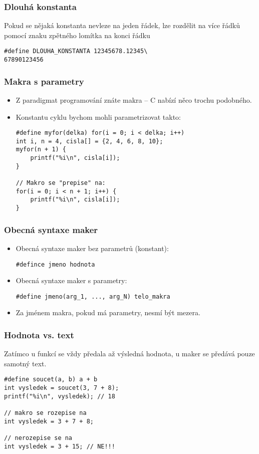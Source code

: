 \documentclass{beamer}
\newenvironment{itemizex}%
  {\large \begin{itemize}%
    \setlength{\itemsep}{8pt}%
    \setlength{\parskip}{8pt}}%
  {\end{itemize}}
\begin{document}
\begin{frame}[t,fragile]\frametitle{Dlouhá konstanta} 
Pokud se nějaká konstanta nevleze na jeden řádek, lze rozdělit na více řádků pomocí znaku zpětného lomítka na konci řádku
\begin{verbatim} 
#define DLOUHA_KONSTANTA 12345678.12345\
67890123456
\end{verbatim}
\end{frame}


\begin{frame}[t,fragile]\frametitle{Makra s parametry} 
    \begin{itemize}
        \item Z paradigmat programování znáte makra -- C nabízí něco trochu podobného. 
        \item Konstantu cyklu bychom mohli parametrizovat takto:
\begin{verbatim} 
#define myfor(delka) for(i = 0; i < delka; i++)
int i, n = 4, cisla[] = {2, 4, 6, 8, 10};
myfor(n + 1) {
    printf("%i\n", cisla[i]);
}

// Makro se "prepise" na:
for(i = 0; i < n + 1; i++) {
    printf("%i\n", cisla[i]);
}
\end{verbatim}
    \end{itemize}
\end{frame}


\begin{frame}[t,fragile]\frametitle{Obecná syntaxe maker} 
\begin{itemizex}
    \item Obecná syntaxe maker bez parametrů (konstant):
\begin{verbatim} 
#defince jmeno hodnota
\end{verbatim}
    \item Obecná syntaxe maker s parametry:
    \begin{verbatim} 
#define jmeno(arg_1, ..., arg_N) telo_makra
    \end{verbatim}
    \item Za jménem makra, pokud má parametry, nesmí být mezera. 
\end{itemizex}
\end{frame}


\begin{frame}[t,fragile]\frametitle{Hodnota vs. text} 
Zatímco u funkcí se vždy předala až výsledná hodnota, u maker se předává pouze samotný text. 
\begin{verbatim} 
#define soucet(a, b) a + b
int vysledek = soucet(3, 7 + 8);
printf("%i\n", vysledek); // 18

// makro se rozepise na
int vysledek = 3 + 7 + 8;

// nerozepise se na 
int vysledek = 3 + 15; // NE!!!
\end{verbatim}
\end{frame}
\end{document}
